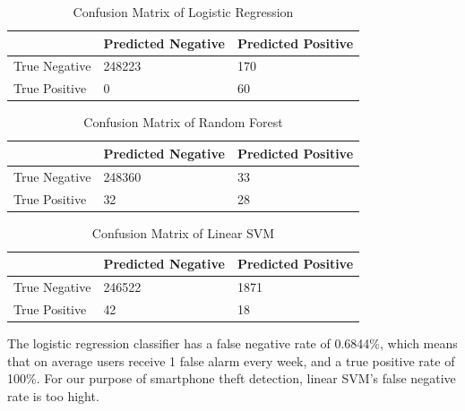 \documentclass{soups}
\begin{document}
\begin{table}[H]
\centering
\begin{tabular}{@{}lll@{}}
\toprule
              & Predicted Negative & Predicted Positive \\ \midrule
True Negative & 248223             & 170                \\
True Positive & 0                  & 60                 \\ \bottomrule
\end{tabular}
\caption{Confusion Matrix of Logistic Regression}
\label{my-label}
\end{table}

\begin{table}[H]
\centering
\begin{tabular}{@{}lll@{}}
\toprule
              & Predicted Negative & Predicted Positive \\ \midrule
True Negative & 248360             & 33                 \\
True Positive & 32                 & 28                 \\ \bottomrule
\end{tabular}
\caption{Confusion Matrix of Random Forest}
\label{my-label}
\end{table}

\begin{table}[H]
\centering
\begin{tabular}{@{}lll@{}}
\toprule
              & Predicted Negative & Predicted Positive \\ \midrule
True Negative & 246522             & 1871               \\
True Positive & 42                 & 18                 \\ \bottomrule
\end{tabular}
\caption{Confusion Matrix of Linear SVM}
\label{my-label}
\end{table}


The logistic regression classifier has a false negative rate of 0.6844\%, which means that on average users receive 1 false alarm every week, and a true positive rate of 100\%. For our purpose of smartphone theft detection, linear SVM's false negative rate is too hight.
\end{document}
